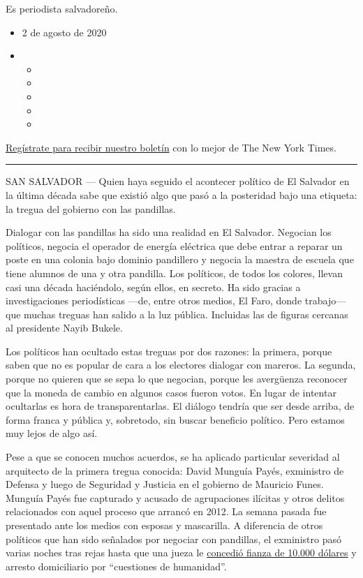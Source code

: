 Es periodista salvadoreño.

\begin{itemize}
\item
  2 de agosto de 2020
\item
  \begin{itemize}
  \item
  \item
  \item
  \item
  \item
  \end{itemize}
\end{itemize}

\href{https://www.nytimes3xbfgragh.onion/newsletters/el-times}{Regístrate
para recibir nuestro boletín} con lo mejor de The New York Times.

\begin{center}\rule{0.5\linewidth}{\linethickness}\end{center}

SAN SALVADOR --- Quien haya seguido el acontecer político de El Salvador
en la última década sabe que existió algo que pasó a la posteridad bajo
una etiqueta: la tregua del gobierno con las pandillas.

Dialogar con las pandillas ha sido una realidad en El Salvador. Negocian
los políticos, negocia el operador de energía eléctrica que debe entrar
a reparar un poste en una colonia bajo dominio pandillero y negocia la
maestra de escuela que tiene alumnos de una y otra pandilla. Los
políticos, de todos los colores, llevan casi una década haciéndolo,
según ellos, en secreto. Ha sido gracias a investigaciones periodísticas
---de, entre otros medios, El Faro, donde trabajo--- que muchas treguas
han salido a la luz pública. Incluidas las de figuras cercanas al
presidente Nayib Bukele.

Los políticos han ocultado estas treguas por dos razones: la primera,
porque saben que no es popular de cara a los electores dialogar con
mareros. La segunda, porque no quieren que se sepa lo que negocian,
porque les avergüenza reconocer que la moneda de cambio en algunos casos
fueron votos. En lugar de intentar ocultarlas es hora de
transparentarlas. El diálogo tendría que ser desde arriba, de forma
franca y pública y, sobretodo, sin buscar beneficio político. Pero
estamos muy lejos de algo así.

Pese a que se conocen muchos acuerdos, se ha aplicado particular
severidad al arquitecto de la primera tregua conocida: David Munguía
Payés, exministro de Defensa y luego de Seguridad y Justicia en el
gobierno de Mauricio Funes. Munguía Payés fue capturado y acusado de
agrupaciones ilícitas y otros delitos relacionados con aquel proceso que
arrancó en 2012. La semana pasada fue presentado ante los medios con
esposas y mascarilla. A diferencia de otros políticos que han sido
señalados por negociar con pandillas, el exministro pasó varias noches
tras rejas hasta que una jueza le
\href{https://www.laprensagrafica.com/elsalvador/Imponen-10000-de-fianza-y-arresto-domiciliario-a-Payes-20200729-0084.html}{concedió
fianza de 10.000 dólares} y arresto domiciliario por ``cuestiones de
humanidad''.

